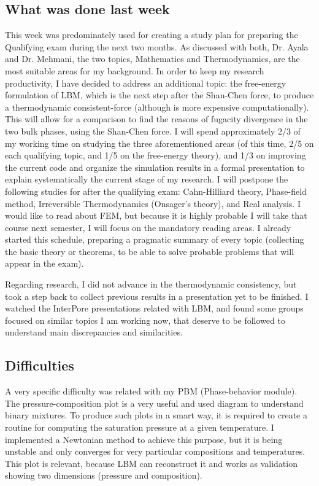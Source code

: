 \documentclass[12pt]{article}
\begin{document}
	\subsection*{What was done last week}
	This week was predominately used for creating a study plan for preparing the Qualifying exam during the next two months. As discussed with both, Dr. Ayala and Dr. Mehmani, the two topics, Mathematics and Thermodynamics, are the most suitable areas for my background. In order to keep my research productivity, I have decided to address an additional topic: the free-energy formulation of LBM, which is the next step after the Shan-Chen force, to produce a thermodynamic consistent-force (although is more expensive computationally). This will allow for a comparison to find the reasons of fugacity divergence in the two bulk phases, using the Shan-Chen force. I will spend approximately 2/3 of my working time on studying the three aforementioned areas (of this time, 2/5 on each qualifying topic, and 1/5 on the free-energy theory), and 1/3 on improving the current code and organize the simulation results in a formal presentation to explain systematically the current stage of my research. I will postpone the following studies for after the qualifying exam: Cahn-Hilliard theory, Phase-field method, Irreversible Thermodynamics (Onsager's theory), and Real analysis. I would like to read about FEM, but because it is highly probable I will take that course next semester, I will focus on the mandatory reading areas. I already started this schedule, preparing a pragmatic summary of every topic (collecting the basic theory or theorems, to be able to solve probable problems that will appear in the exam). 
	
	Regarding research, I did not advance in the thermodynamic consistency, but took a step back to collect previous results in a presentation yet to be finished. I watched the InterPore presentations related with LBM, and found some groups focused on similar topics I am working now, that deserve to be followed to understand main discrepancies and similarities. 
	
	\subsection*{Difficulties}
	A very specific difficulty was related with my PBM (Phase-behavior module). The pressure-composition plot is a very useful and used diagram to understand binary mixtures. To produce such plots in a smart way, it is required to create a routine for computing the saturation pressure at a given temperature. I implemented a Newtonian method to achieve this purpose, but it is being unstable and only converges for very particular compositions and temperatures. This plot is relevant, because LBM can reconstruct it and works as validation showing two dimensions (pressure and composition).
	
\end{document}
